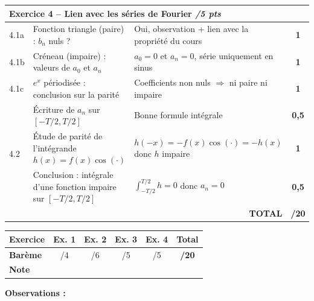\documentclass[12pt,a4paper]{article}
\begin{document}
\begin{tabular}{|p{0.5cm}|p{7.5cm}|p{5.5cm}|c|}
    \multicolumn{4}{|l|}{\cellcolor{exobg}\textbf{Exercice 4 -- Lien avec les séries de Fourier} \hfill \textit{/5 pts}} \\
    \hline
    4.1a & Fonction triangle (paire) : $b_n$ nuls ? & Oui, observation + lien avec la propriété du cours & \textbf{1} \\
    \hline
    4.1b & Créneau (impaire) : valeurs de $a_0$ et $a_n$ & $a_0 = 0$ et $a_n = 0$, série uniquement en sinus & \textbf{1} \\
    \hline
    4.1c & $e^x$ périodisée : conclusion sur la parité & Coefficients non nuls $\Rightarrow$ ni paire ni impaire & \textbf{1} \\
    \hline
    \multirow{3}{*}{4.2} & Écriture de $a_n$ sur $[-T/2, T/2]$ & Bonne formule intégrale & \textbf{0,5} \\
    \cline{2-4}
    & Étude de parité de l'intégrande $h(x) = f(x)\cos(\cdot)$ & $h(-x) = -f(x)\cos(\cdot) = -h(x)$ donc $h$ impaire & \textbf{1} \\
    \cline{2-4}
    & Conclusion : intégrale d'une fonction impaire sur $[-T/2, T/2]$ & $\int_{-T/2}^{T/2} h = 0$ donc $a_n = 0$ & \textbf{0,5} \\
    \hline

    \multicolumn{3}{|r|}{\cellcolor{totalbg}\textbf{TOTAL}} & \cellcolor{totalbg}\textbf{/20} \\
    \hline
\end{tabular}

\bigskip

\begin{center}
\renewcommand{\arraystretch}{2}
\begin{tabular}{|p{3.2cm}|c|c|c|c|c|}
    \hline
    \textbf{Exercice} & Ex. 1 & Ex. 2 & Ex. 3 & Ex. 4 & \textbf{Total} \\
    \hline
    \textbf{Barème} & /4 & /6 & /5 & /5 & \textbf{/20} \\
    \hline
    \textbf{Note} & \hspace{1.5cm} & \hspace{1.5cm} & \hspace{1.5cm} & \hspace{1.5cm} & \\
    \hline
\end{tabular}
\end{center}

\bigskip
\noindent\textbf{Observations :}\\[30pt]
\end{document}
